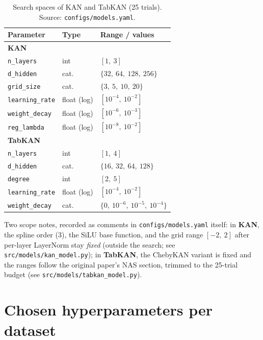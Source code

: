 \begin{table}[htbp]
\centering\footnotesize
\caption[Search spaces --- KAN networks]{Search spaces of KAN and
TabKAN (25 trials). Source:
\texttt{configs/\allowbreak models.\allowbreak yaml}.}
\label{tab:app-busca-kan}
\begin{tabular}{lll}
\toprule
Parameter & Type & Range / values \\
\midrule
\multicolumn{3}{l}{\textbf{KAN}} \\
\texttt{n\_layers}      & int   & $[1,\ 3]$ \\
\texttt{d\_hidden}      & cat.  & $\{32,\ 64,\ 128,\ 256\}$ \\
\texttt{grid\_size}     & cat.  & $\{3,\ 5,\ 10,\ 20\}$ \\
\texttt{learning\_rate} & float (log) & $[10^{-4},\ 10^{-2}]$ \\
\texttt{weight\_decay}  & float (log) & $[10^{-6},\ 10^{-3}]$ \\
\texttt{reg\_lambda}    & float (log) & $[10^{-8},\ 10^{-2}]$ \\
\midrule
\multicolumn{3}{l}{\textbf{TabKAN}} \\
\texttt{n\_layers}      & int   & $[1,\ 4]$ \\
\texttt{d\_hidden}      & cat.  & $\{16,\ 32,\ 64,\ 128\}$ \\
\texttt{degree}         & int   & $[2,\ 5]$ \\
\texttt{learning\_rate} & float (log) & $[10^{-4},\ 10^{-2}]$ \\
\texttt{weight\_decay}  & cat.  & $\{0,\ 10^{-6},\ 10^{-5},\ 10^{-4}\}$ \\
\bottomrule
\end{tabular}
\end{table}

Two scope notes, recorded as comments in
\texttt{configs/\allowbreak models.\allowbreak yaml} itself: in
\textbf{KAN}, the spline order ($3$), the SiLU base function, and the
grid range $[-2,\ 2]$ after per-layer LayerNorm stay \emph{fixed}
(outside the search; see
\texttt{src/\allowbreak models/\allowbreak kan\_\allowbreak model.\allowbreak py});
in \textbf{TabKAN}, the ChebyKAN variant is fixed and the ranges
follow the original paper's NAS section, trimmed to the 25-trial
budget (see
\texttt{src/\allowbreak models/\allowbreak tabkan\_\allowbreak model.\allowbreak py}).

\clearpage
\section{Chosen hyperparameters per dataset}
\label{app:hp-escolhidos}

